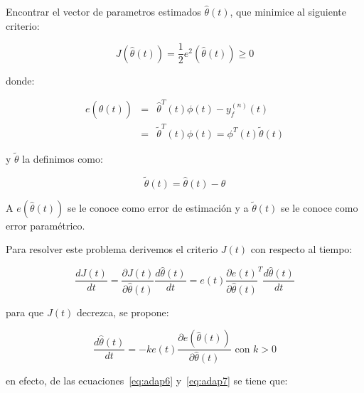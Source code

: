             \begin{problema}
                Encontrar el vector de parametros estimados $\hat{\theta}(t)$, que minimice al siguiente criterio:

                \begin{equation}
                    J \left( \hat{\theta}(t) \right) = \frac{1}{2} e^2 \left( \hat{\theta}(t) \right) \ge 0
                \end{equation}

                donde:

                \begin{eqnarray}
                    e \left( \hat{\theta}(t) \right) & = & \hat{\theta}^T(t) \phi(t) - y_f^{(n)}(t) \nonumber \\
                    & = & \tilde{\theta}^T(t) \phi(t) = \phi^T(t) \tilde{\theta}(t)
                \end{eqnarray}

                y $\tilde{\theta}$ la definimos como:

                \begin{equation}
                    \tilde{\theta}(t) = \hat{\theta}(t) - \theta
                \end{equation}

                A $e \left( \hat{\theta}(t) \right)$ se le conoce como error de estimación y a $\tilde{\theta}(t)$ se le conoce como error paramétrico.
            \end{problema}

            Para resolver este problema derivemos el criterio $J(t)$ con respecto al tiempo:

            \begin{equation} \label{eq:adap6}
                \frac{d J(t)}{dt} = \frac{\partial J(t)}{\partial \hat{\theta}(t)} \frac{d \hat{\theta}(t)}{dt} = e(t) \frac{\partial e(t)}{\partial \hat{\theta}(t)}^T \frac{d \hat{\theta}(t)}{dt}
            \end{equation}

            para que $J(t)$ decrezca, se propone:

            \begin{equation}\label{eq:adap7}
                \frac{d \hat{\theta}(t)}{dt} = -k e(t) \frac{\partial e(\hat{\theta}(t))}{\partial \hat{\theta}(t)} \text{ con } k > 0
            \end{equation}

            en efecto, de las ecuaciones~\ref{eq:adap6} y~\ref{eq:adap7} se tiene que:

